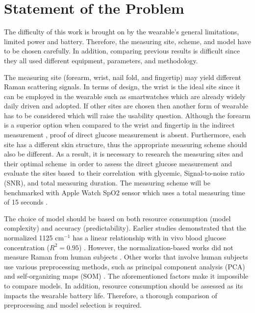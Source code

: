 \section{Statement of the Problem}

The difficulty of this work is brought on by the wearable's general limitations, limited power and battery.
Therefore, the measuring site, scheme, and model have to be chosen carefully.
In addition, comparing previous results is difficult since they all used different equipment, parameters, and methodology.

The measuring site (forearm, wrist, nail fold, and fingertip) may yield different Raman scattering signals.
In terms of design, the wrist is the ideal site since it can be employed in the wearable such as smartwatches which are already widely daily driven and adopted.
If other sites are chosen then another form of wearable has to be considered which will raise the usability question.
Although the forearm is a superior option when compared to the wrist and fingertip in the indirect measurement \citep{sitecompare}, proof of direct glucose measurement is absent.
Furthermore, each site has a different skin structure, thus the appropriate measuring scheme should also be different.
As a result, it is necessary to research the measuring sites and their optimal scheme in order to assess the direct glucose measurement and evaluate the sites based to their correlation with glycemic, Signal-to-noise ratio (SNR), and total measuring duration.
The measuring scheme will be benchmarked with Apple Watch SpO2 sensor which uses a total measuring time of 15 seconds \citep{applewatch}.

The choice of model should be based on both resource consumption (model complexity) and accuracy (predictability).
Earlier studies demonstrated that the normalized 1125 $\text{cm}^{-1}$ has a linear relationship with in vivo blood glucose concentration ($R^2 = 0.95$) \citep{solutionGlucose}.
However, the normalization-based works did not measure Raman from human subjects \citep{solutionGlucose,directGlucose}.
Other works that involve human subjects use various preprocessing methods, such as principal component analysis (PCA) \citep{ramanNailFold2019} and self-organizing maps (SOM) \citep{sitecompare}.
The aforementioned factors make it impossible to compare models.
In addition, resource consumption should be assessed as its impacts the wearable battery life.
Therefore, a thorough comparison of preprocessing and model selection is required.


